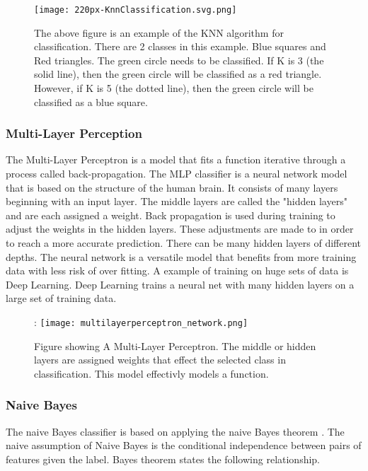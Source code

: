 \begin{figure}[h]
    \centering
    \texttt{[image: 220px-KnnClassification.svg.png]}
    \caption{The above figure is an example of the KNN algorithm for classification. There are 2 classes in this example. Blue squares and Red triangles.
    The green circle needs to be classified. If K is 3 (the solid line), then the green circle will be classified as a red triangle. 
    However, if K is 5 (the dotted line), then the green circle will be classified as a blue square.}
    \label{fig:knn}
\end{figure}


\subsubsection{Multi-Layer Perception}
The Multi-Layer Perceptron is a model that fits a function iterative through a process called back-propagation.
The MLP classifier is a neural network model that is based on the structure of the human brain.
It consists of many layers beginning with an input layer.
The middle layers are called the "hidden layers" and are each assigned a weight.
Back propagation is used during training to adjust the weights in the hidden layers.
These adjustments are made to in order to reach a more accurate prediction.
There can be many hidden layers of different depths.
The neural network is a versatile model that benefits from more training data with less risk of over fitting.
A example of training on huge sets of data is Deep Learning.
Deep Learning trains a neural net with many hidden layers on a large set of training data.

\begin{figure}[h]:
    \centering
    \texttt{[image: multilayerperceptron\_network.png]}
    \caption{Figure showing A Multi-Layer Perceptron. The middle or hidden layers are assigned weights that effect the selected class in classification.
    This model effectivly models a function.}
    \label{}
\end{figure}



\subsubsection{Naive Bayes}
The naive Bayes classifier is based on applying the naive Bayes theorem \cite{zhang2004optimality}.
The naive assumption of Naive Bayes is the conditional independence between pairs of features given the label.
Bayes theorem states the following relationship.


